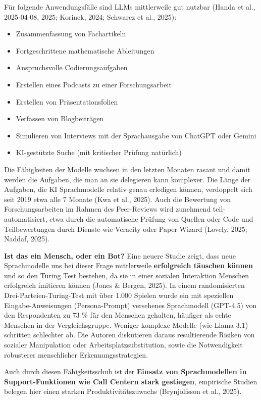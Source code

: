\documentclass[
  ngerman,
  letterpaper,
  DIV=11]{scrreprt}
\providecommand{\tightlist}{%
  \setlength{\itemsep}{0pt}\setlength{\parskip}{0pt}}
\begin{document}
Für folgende Anwendungsfälle sind LLMs mittlerweile gut nutzbar (Handa
et al., 2025-04-08, 2025; Korinek, 2024; Schwarcz et al., 2025):

\begin{itemize}
\tightlist
\item
  Zusammenfassung von Fachartikeln
\item
  Fortgeschrittene mathematische Ableitungen
\item
  Anspruchsvolle Codierungsaufgaben
\item
  Erstellen eines Podcasts zu einer Forschungsarbeit
\item
  Erstellen von Präsentationsfolien
\item
  Verfassen von Blogbeiträgen
\item
  Simulieren von Interviews mit der Sprachausgabe von ChatGPT oder
  Gemini
\item
  KI-gestützte Suche (mit kritischer Prüfung natürlich)
\end{itemize}

Die Fähigkeiten der Modelle wuchsen in den letzten Monaten rasant und
damit werden die Aufgaben, die man an sie delegieren kann komplexer. Die
Länge der Aufgaben, die KI Sprachmodelle relativ genau erledigen können,
verdoppelt sich seit 2019 etwa alle 7 Monate (Kwa et al., 2025). Auch
die Bewertung von Forschungsarbeiten im Rahmen des Peer-Reviews wird
zunehmend teil-automatisiert, etwa durch die automatische Prüfung von
Quellen oder Code und Teilbewertungen durch Dienste wie Veracity oder
Paper Wizard (Lovely, 2025; Naddaf, 2025).

\textbf{Ist das ein Mensch, oder ein Bot?} Eine neuere Studie zeigt,
dass neue Sprachmodelle uns bei dieser Frage mittlerweile
\textbf{erfolgreich täuschen können} und so den Turing Test bestehen, da
sie in einer sozialen Interaktion Menschen erfolgreich imitieren können
(Jones \& Bergen, 2025). In einem randomisierten
Drei-Parteien-Turing-Test mit über 1.000 Spielen wurde ein mit
speziellen Eingabe-Anweisungen (Persona-Prompt) versehenes Sprachmodell
(GPT-4.5) von den Respondenten zu 73 \% für den Menschen gehalten,
häufiger als echte Menschen in der Vergleichsgruppe. Weniger komplexe
Modelle (wie Llama 3.1) schritten schlechter ab. Die Autoren diskutieren
daraus resultierende Risiken von sozialer Manipulation oder
Arbeitsplatzsubstitution, sowie die Notwendigkeit robusterer
menschlicher Erkennungsstrategien.

Auch durch diesen Fähigkeitsschub ist der \textbf{Einsatz von
Sprachmodellen in Support-Funktionen wie Call Centern stark gestiegen},
empirische Studien belegen hier einen starken Produktivitätszuwachs
(Brynjolfsson et al., 2025).
\end{document}

